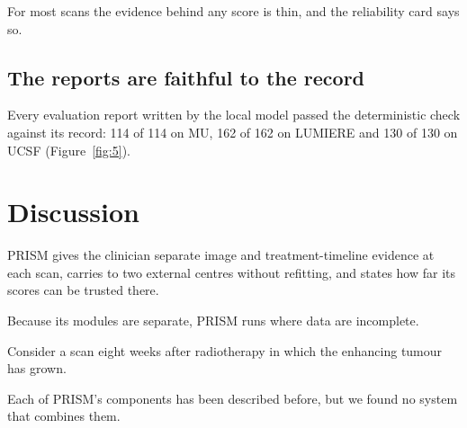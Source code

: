 \documentclass[largeformat]{interact} %
\begin{document}
For most scans the evidence behind any score is thin, and the reliability card says so.

\subsection{The reports are faithful to the record}\label{sec:3.5}

Every evaluation report written by the local model passed the deterministic check against its record: 114 of 114 on
MU, 162 of 162 on LUMIERE and 130 of 130 on UCSF (Figure~\ref{fig:5}).

\section{Discussion}\label{sec:4}

PRISM gives the clinician separate image and treatment-timeline evidence at each scan, carries to two external
centres without refitting, and states how far its scores can be trusted there.

Because its modules are separate, PRISM runs where data are incomplete.

Consider a scan eight weeks after radiotherapy in which the enhancing tumour has grown.

Each of PRISM's components has been described before, but we found no system that combines them.
\end{document}
